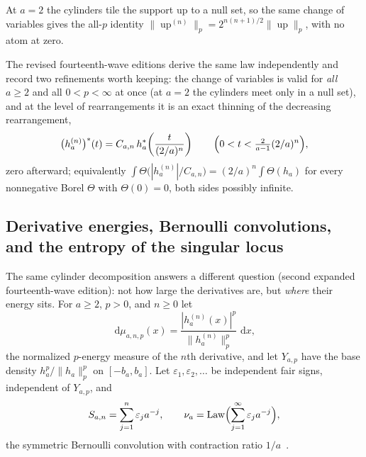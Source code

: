 \documentclass[11pt,oneside]{article}
\numberwithin{equation}{section}
\theoremstyle{definition}
\theoremstyle{remark}
\newcommand{\Law}{\operatorname{Law}}
\newcommand{\Up}{\operatorname{up}}
\newcommand{\dd}{\,\mathrm d}
\begin{document}
At $a=2$ the cylinders tile the support up to a null set, so the same change
of variables gives the all-$p$ identity
$\|\Up^{(n)}\|_p=2^{n(n+1)/2}\|\Up\|_p$, with no atom at zero.

The revised fourteenth-wave editions derive the same law independently and
record two refinements worth keeping: the change of variables is valid for
\emph{all} $a\ge2$ and all $0<p<\infty$ at once (at $a=2$ the cylinders meet
only in a null set), and at the level of rearrangements it is an exact
thinning of the decreasing rearrangement,
\begin{equation}\label{p6:eq:rearrangement-thinning}
 \bigl(h_a^{(n)}\bigr)^{*}(t)
 =C_{a,n}\,h_a^{*}\!\left(\frac t{(2/a)^n}\right)
 \qquad\Bigl(0<t<\tfrac{2}{a-1}(2/a)^n\Bigr),
\end{equation}
zero afterward; equivalently
$\int\Theta\bigl(|h_a^{(n)}|/C_{a,n}\bigr)
=(2/a)^n\int\Theta(h_a)$ for every nonnegative Borel $\Theta$ with
$\Theta(0)=0$, both sides possibly infinite.

\subsection{Derivative energies, Bernoulli convolutions, and the entropy of
the singular locus}

The same cylinder decomposition answers a different question (second
expanded fourteenth-wave edition): not how large the derivatives are, but
\emph{where} their energy sits.  For $a\ge2$, $p>0$, and $n\ge0$ let
\begin{equation}\label{p6:eq:energy-measure}
 \dd\mu_{a,n,p}(x)
 =\frac{|h_a^{(n)}(x)|^p}{\|h_a^{(n)}\|_p^p}\,\dd x,
\end{equation}
the normalized $p$-energy measure of the $n$th derivative, and let
$Y_{a,p}$ have the base density $h_a^p/\|h_a\|_p^p$ on $[-b_a,b_a]$.  Let
$\varepsilon_1,\varepsilon_2,\ldots$ be independent fair signs, independent
of $Y_{a,p}$, and
\[
 S_{a,n}=\sum_{j=1}^{n}\varepsilon_ja^{-j},
 \qquad
 \nu_a=\Law\Bigl(\sum_{j=1}^{\infty}\varepsilon_ja^{-j}\Bigr),
\]
the symmetric Bernoulli convolution with contraction ratio
$1/a$~\cite{p6:peres}.
\end{document}
